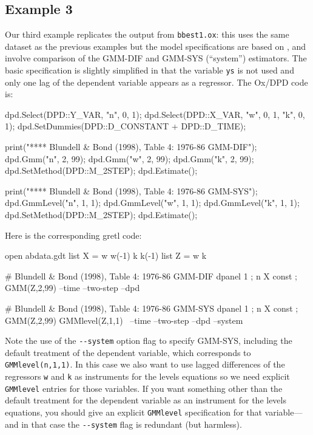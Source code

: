 \subsection{Example 3}

Our third example replicates the  output from
\texttt{bbest1.ox}: this uses the same dataset as the previous
examples but the model specifications are based on
\cite{blundell-bond98}, and involve comparison of the GMM-DIF and
GMM-SYS (``system'') estimators. The basic specification is slightly
simplified in that the variable \texttt{ys} is not used and only one
lag of the dependent variable appears as a regressor. The Ox/DPD code
is:

\begin{code}
dpd.Select(DPD::Y_VAR, {"n", 0, 1});
dpd.Select(DPD::X_VAR, {"w", 0, 1, "k", 0, 1});
dpd.SetDummies(DPD::D_CONSTANT + DPD::D_TIME);

print("\n\n***** Blundell & Bond (1998), Table 4: 1976-86 GMM-DIF");
dpd.Gmm("n", 2, 99);
dpd.Gmm("w", 2, 99);
dpd.Gmm("k", 2, 99);
dpd.SetMethod(DPD::M_2STEP);
dpd.Estimate();

print("\n\n***** Blundell & Bond (1998), Table 4: 1976-86 GMM-SYS");
dpd.GmmLevel("n", 1, 1);
dpd.GmmLevel("w", 1, 1);
dpd.GmmLevel("k", 1, 1);
dpd.SetMethod(DPD::M_2STEP);
dpd.Estimate();
\end{code}

Here is the corresponding gretl code:

\begin{code}
open abdata.gdt
list X = w w(-1) k k(-1)
list Z = w k

# Blundell & Bond (1998), Table 4: 1976-86 GMM-DIF
dpanel 1 ; n X const ; GMM(Z,2,99) --time --two-step --dpd

# Blundell & Bond (1998), Table 4: 1976-86 GMM-SYS
dpanel 1 ; n X const ; GMM(Z,2,99) GMMlevel(Z,1,1) \
 --time --two-step --dpd --system
\end{code}

Note the use of the \verb|--system| option flag to specify GMM-SYS,
including the default treatment of the dependent variable, which
corresponds to \texttt{GMMlevel(n,1,1)}. In this case we also want to
use lagged differences of the regressors \texttt{w} and \texttt{k} as
instruments for the levels equations so we need explicit
\texttt{GMMlevel} entries for those variables. If you want something
other than the default treatment for the dependent variable as an
instrument for the levels equations, you should give an explicit
\texttt{GMMlevel} specification for that variable---and in that case
the \verb|--system| flag is redundant (but harmless).

